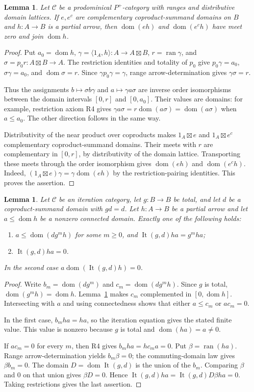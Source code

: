\documentclass[11pt]{article}
\newtheorem{lemma}[theorem]{Lemma}
\newcommand{\C}{\mathcal C}\newcommand{\D}{\mathcal D}\newcommand{\B}{\mathcal B}
\newcommand{\dom}{\operatorname{dom}}\newcommand{\ran}{\operatorname{ran}}
\newcommand{\It}{\operatorname{It}}\newcommand{\Tur}{\operatorname{Tur}}
\begin{document}
\begin{lemma}\label{lem:splitpullback}
Let $\C$ be a prodominical $P^+$-category with ranges and distributive domain lattices. If $e,e^c$ are complementary coproduct-summand domains on $B$ and $h:A\to B$ is a partial arrow, then $\dom(eh)$ and $\dom(e^ch)$ have meet zero and join $\dom h$.
\end{lemma}
\begin{proof}
Put $a_0=\dom h$, $\gamma=\langle1_A,h\rangle:A\to A\boxtimes B$, $r=\ran\gamma$, and $\sigma=p_0r:A\boxtimes B\to A$. The restriction identities and totality of $p_0$ give $p_0\gamma=a_0$, $\sigma\gamma=a_0$, and $\dom\sigma=r$. Since $\gamma p_0\gamma=\gamma$, range arrow-determination gives $\gamma\sigma=r$.

Thus the assignments $b\mapsto\sigma b\gamma$ and $a\mapsto\gamma a\sigma$ are inverse order isomorphisms between the domain intervals $[0,r]$ and $[0,a_0]$. Their values are domains: for example, restriction axiom R4 gives $\gamma a\sigma=r\dom(a\sigma)=\dom(a\sigma)$ when $a\leq a_0$. The other direction follows in the same way.

Distributivity of the near product over coproducts makes $1_A\boxtimes e$ and $1_A\boxtimes e^c$ complementary coproduct-summand domains. Their meets with $r$ are complementary in $[0,r]$, by distributivity of the domain lattice. Transporting these meets through the order isomorphism gives $\dom(eh)$ and $\dom(e^ch)$. Indeed, $(1_A\boxtimes e)\gamma=\gamma\dom(eh)$ by the restriction-pairing identities. This proves the assertion.
\end{proof}

\begin{lemma}\label{lem:dichotomy}
Let $\C$ be an iteration category, let $g:B\to B$ be total, and let $d$ be a coproduct-summand domain with $gd=d$. Let $h:A\to B$ be a partial arrow and let $a\leq\dom h$ be a nonzero connected domain. Exactly one of the following holds:
\begin{enumerate}
\item $a\leq\dom(dg^m h)$ for some $m\geq0$, and $\It(g,d)ha=g^mha$;
\item $\It(g,d)ha=0$.
\end{enumerate}
In the second case $a\dom(\It(g,d)h)=0$.
\end{lemma}
\begin{proof}
Write $b_m=\dom(dg^m)$ and $c_m=\dom(dg^mh)$. Since $g$ is total, $\dom(g^mh)=\dom h$. Lemma~\ref{lem:splitpullback} makes $c_m$ complemented in $[0,\dom h]$. Intersecting with $a$ and using connectedness shows that either $a\leq c_m$ or $ac_m=0$.

In the first case, $b_mha=ha$, so the iteration equation gives the stated finite value. This value is nonzero because $g$ is total and $\dom(ha)=a\ne0$.

If $ac_m=0$ for every $m$, then R4 gives $b_mha=hc_ma=0$. Put $\beta=\ran(ha)$. Range arrow-determination yields $b_m\beta=0$; the commuting-domain law gives $\beta b_m=0$. The domain $D=\dom\It(g,d)$ is the union of the $b_m$. Comparing $\beta$ and $0$ on that union gives $\beta D=0$. Hence $\It(g,d)ha=\It(g,d)D\beta ha=0$. Taking restrictions gives the last assertion.
\end{proof}
\end{document}
